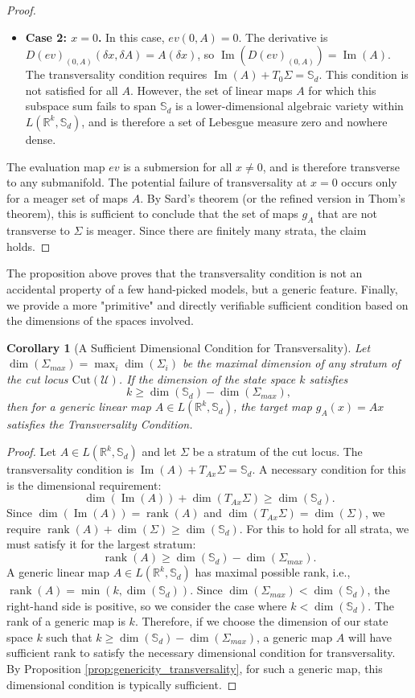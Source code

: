 \documentclass[12pt, letterpaper]{amsart}
\newcommand{\Ucal}{\mathcal{U}}
\DeclareMathOperator{\Image}{Im}
\newcommand{\Sd}{\mathbb{S}_d}
\newcommand{\R}{\mathbb{R}}
\DeclareMathOperator{\rank}{rank}
\theoremstyle{plain}
\newtheorem{corollary}[theorem]{Corollary}
\theoremstyle{definition}
\theoremstyle{remark}
\numberwithin{equation}{section} %
\begin{document}
\begin{proof}
\begin{itemize}
    \item \textbf{Case 2: \(x = 0\).} In this case, \(ev(0,A) = 0\). The derivative is \(D(ev)_{(0,A)}(\delta x, \delta A) = A(\delta x)\), so \(\Image(D(ev)_{(0,A)}) = \Image(A)\). The transversality condition requires \(\Image(A) + T_0\Sigma = \Sd\). This condition is not satisfied for all \(A\). However, the set of linear maps \(A\) for which this subspace sum fails to span \(\Sd\) is a lower-dimensional algebraic variety within \(L(\R^k, \Sd)\), and is therefore a set of Lebesgue measure zero and nowhere dense.
\end{itemize}
The evaluation map \(ev\) is a submersion for all \(x \neq 0\), and is therefore transverse to any submanifold. The potential failure of transversality at \(x=0\) occurs only for a meager set of maps \(A\). By Sard's theorem (or the refined version in Thom's theorem), this is sufficient to conclude that the set of maps \(g_A\) that are not transverse to \(\Sigma\) is meager. Since there are finitely many strata, the claim holds.
\end{proof}

The proposition above proves that the transversality condition is not an accidental property of a few hand-picked models, but a generic feature. Finally, we provide a more "primitive" and directly verifiable sufficient condition based on the dimensions of the spaces involved.

\begin{corollary}[A Sufficient Dimensional Condition for Transversality]
\label{cor:dimensional_condition}
Let \(\dim(\Sigma_{max}) = \max_i \dim(\Sigma_i)\) be the maximal dimension of any stratum of the cut locus \(\mathrm{Cut}(\Ucal)\). If the dimension of the state space \(k\) satisfies
\[ k \ge \dim(\Sd) - \dim(\Sigma_{max}), \]
then for a generic linear map \(A \in L(\R^k, \Sd)\), the target map \(g_A(x)=Ax\) satisfies the Transversality Condition.
\end{corollary}

\begin{proof}
Let \(A \in L(\R^k, \Sd)\) and let \(\Sigma\) be a stratum of the cut locus. The transversality condition is \(\Image(A) + T_{Ax}\Sigma = \Sd\). A necessary condition for this is the dimensional requirement:
\[ \dim(\Image(A)) + \dim(T_{Ax}\Sigma) \ge \dim(\Sd). \]
Since \(\dim(\Image(A)) = \rank(A)\) and \(\dim(T_{Ax}\Sigma) = \dim(\Sigma)\), we require \(\rank(A) + \dim(\Sigma) \ge \dim(\Sd)\).
For this to hold for all strata, we must satisfy it for the largest stratum:
\[ \rank(A) \ge \dim(\Sd) - \dim(\Sigma_{max}). \]
A generic linear map \(A \in L(\R^k, \Sd)\) has maximal possible rank, i.e., \(\rank(A) = \min(k, \dim(\Sd))\). Since \(\dim(\Sigma_{max}) < \dim(\Sd)\), the right-hand side is positive, so we consider the case where \(k < \dim(\Sd)\). The rank of a generic map is \(k\). Therefore, if we choose the dimension of our state space \(k\) such that \(k \ge \dim(\Sd) - \dim(\Sigma_{max})\), a generic map \(A\) will have sufficient rank to satisfy the necessary dimensional condition for transversality. By Proposition \ref{prop:genericity_transversality}, for such a generic map, this dimensional condition is typically sufficient.
\end{proof}
\end{document}
